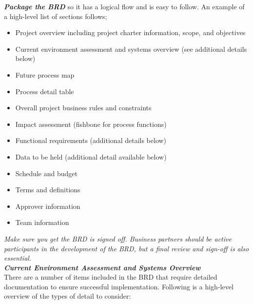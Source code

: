 \documentclass{article}
\begin{document}
{\textbf{\textit{Package the BRD}} so it has a logical flow and is easy to follow. An example of a high-level list of sections follows;

\begin{itemize}
    \item Project overview including project charter information, scope, and objectives
    \item Current environment assessment and systems overview (see additional details below)
    \item Future process map
    \item Process detail table
    \item Overall project business rules and constraints
    \item Impact assessment (fishbone for process functions)
    \item Functional requirements (additional details below)
    \item Data to be held (additional detail available below)
    \item Schedule and budget
    \item Terms and definitions
    \item Approver information
    \item Team information
\end{itemize}

\textit{Make sure you get the BRD is signed off. Business partners should be active participants in the development of the BRD, but a final review and sign-off is also essential.} \\

\textbf{\textit{Current Environment Assessment and Systems Overview}} \\

There are a number of items included in the BRD that require detailed documentation to ensure successful implementation. Following is a high-level overview of the types of detail to consider: 

}
\end{document}
